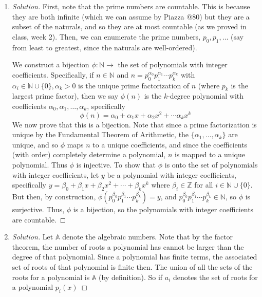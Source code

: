 \documentclass{article}
\newcommand{\N}{{\mathbb N}}
\newcommand{\Z}{{\mathbb Z}}
\begin{document}
\begin{enumerate}
\item \begin{proof}[Solution]\let\qed\relax

	First, note that the prime numbers are countable.
	This is because they are both infinite (which we can assume by Piazza @80)
	but they are a subset of the naturals,
	and so they are at most countable (as we proved in class, week 2).
	Then, we can enumerate the prime numbers, $p_0,p_1,\dots$
	(say from least to greatest, since the naturals are well-ordered).

	We construct a bijection $\phi \colon \N \to$
	the set of polynomials with integer coefficients.
	Specifically, if $n\in\N$ and $n = p_0^{\alpha_0} p_1^{\alpha_1} \cdots p_k^{\alpha_k}$
	with $\alpha_i \in \N \cup \{0\}, \alpha_k > 0$ is the unique prime factorization of $n$
	(where $p_k$ is the largest prime factor),
	then we say $\phi(n)$ is the $k$-degree polynomial
	with coefficients $\alpha_0, \alpha_1, \dots ,\alpha_k$,
	specifically
	\[
		\phi(n) = \alpha_0 + \alpha_1x  + \alpha_2x^2 + \cdots \alpha_kx^k
	\]
	We now prove that this is a bijection.
	Note that since a prime factorization is unique
	by the Fundamental Theorem of Arithmetic,
	the $\{\alpha_1,\dots,\alpha_k\}$ are unique,
	and so $\phi$ maps $n$ to a unique coefficients,
	and since the coefficients (with order) completely determine a polynomial,
	$n$ is mapped to a unique polynomial.
	Thus $\phi$ is injective.
	To show that $\phi$ is onto the set of polynomials with integer coefficients,
	let $y$ be a polynomial with integer coefficients, specifically
	$y = \beta_0 + \beta_1x + \beta_2x^2 + \cdots + \beta_kx^k$
	where $\beta_i \in \Z$ for all $i\in\N\cup\{0\}$.
	But then, by construction, $\phi(p_0^{\beta_0}p_1^{\beta_1}\cdots p_k^{\beta_k}) = y$,
	and $p_0^{\beta_0}p_1^{\beta_1}\cdots p_k^{\beta_k} \in \N$,
	so $\phi$ is surjective.
	Thus, $\phi$ is a bijection, so the polynomials with integer coefficients are countable.
\end{proof}
\item \begin{proof}[Solution]\let\qed\relax
	Let $\mathbb{A}$ denote the algebraic numbers.
	Note that by the factor theorem,
	the number of roots a polynomial has cannot be larger than
	the degree of that polynomial.
	Since a polynomial has finite terms,
	the associated set of roots of that polynomial is finite then.
	The union of all the sets of the roots for a polynomial
	is $\mathbb{A}$ (by definition).
	So if $a_i$ denotes the set of roots for a polynomial $p_i(x)$

\end{proof}
\end{enumerate}
\end{document}

